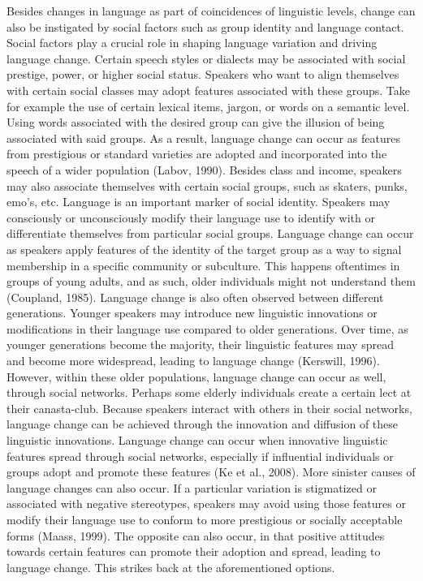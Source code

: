 Besides changes in language as part of coincidences of linguistic levels, change can also be instigated by social factors such as group identity and language contact. Social factors play a crucial role in shaping language variation and driving language change. Certain speech styles or dialects may be associated with social prestige, power, or higher social status. Speakers who want to align themselves with certain social classes may adopt features associated with these groups. Take for example the use of certain lexical items, jargon, or words on a semantic level. Using words associated with the desired group can give the illusion of being associated with said groups. As a result, language change can occur as features from prestigious or standard varieties are adopted and incorporated into the speech of a wider population (Labov, 1990). Besides class and income, speakers may also associate themselves with certain social groups, such as skaters, punks, emo’s, etc. Language is an important marker of social identity. Speakers may consciously or unconsciously modify their language use to identify with or differentiate themselves from particular social groups. Language change can occur as speakers apply features of the identity of the target group as a way to signal membership in a specific community or subculture. This happens oftentimes in groups of young adults, and as such, older individuals might not understand them (Coupland, 1985). Language change is also often observed between different generations. Younger speakers may introduce new linguistic innovations or modifications in their language use compared to older generations. Over time, as younger generations become the majority, their linguistic features may spread and become more widespread, leading to language change (Kerswill, 1996). However, within these older populations, language change can occur as well, through social networks. Perhaps some elderly individuals create a certain lect at their canasta-club. Because speakers interact with others in their social networks, language change can be achieved through the innovation and diffusion of these linguistic innovations. Language change can occur when innovative linguistic features spread through social networks, especially if influential individuals or groups adopt and promote these features (Ke et al., 2008). More sinister causes of language changes can also occur. If a particular variation is stigmatized or associated with negative stereotypes, speakers may avoid using those features or modify their language use to conform to more prestigious or socially acceptable forms (Maass, 1999). The opposite can also occur, in that positive attitudes towards certain features can promote their adoption and spread, leading to language change. This strikes back at the aforementioned options. 

